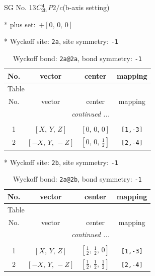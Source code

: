 \documentclass[fleqn,8pt]{jsarticle}
\begin{document}
\setcounter{MaxMatrixCols}{32}

\renewcommand{\tablename}{Table~}
\renewcommand{\figurename}{Figure~}
\begin{center}
\LARGE
SG No. 13\quad$C_{\rm 2h}^{4}$\quad$P2/c$\quad(b-axis setting)\quad[ monoclinic ]
\end{center}

* plus set:\,\,\,$+\left[ 0,\, 0,\, 0 \right]$


* Wyckoff site: {\tt 2a}, site symmetry: {\tt -1}
\renewcommand{\arraystretch}{1.2}
\begin{longtable}{cccc}
\caption{Wyckoff bond: {\tt 2a@2a}, bond symmetry: {\tt -1}}
 \\
 \hline \hline
No. & vector & center & mapping \\ \hline \endfirsthead

\multicolumn{3}{l}{\tablename\ \thetable{}} \\
 \hline \hline
No. & vector & center & mapping \\ \hline \endhead

 \hline \hline
\multicolumn{3}{r}{\footnotesize\it continued ...} \\ \endfoot

 \hline \hline
\multicolumn{3}{r}{} \\ \endlastfoot

1 & $\left[ X,\, Y,\, Z \right]$ & $\left[ 0,\, 0,\, 0 \right]$ & {\tt [1,-3]} \\ \hline
2 & $\left[ - X,\, Y,\, - Z \right]$ & $\left[ 0,\, 0,\, \frac{1}{2} \right]$ & {\tt [2,-4]} \\
\end{longtable}
* Wyckoff site: {\tt 2b}, site symmetry: {\tt -1}
\renewcommand{\arraystretch}{1.2}
\begin{longtable}{cccc}
\caption{Wyckoff bond: {\tt 2a@2b}, bond symmetry: {\tt -1}}
 \\
 \hline \hline
No. & vector & center & mapping \\ \hline \endfirsthead

\multicolumn{3}{l}{\tablename\ \thetable{}} \\
 \hline \hline
No. & vector & center & mapping \\ \hline \endhead

 \hline \hline
\multicolumn{3}{r}{\footnotesize\it continued ...} \\ \endfoot

 \hline \hline
\multicolumn{3}{r}{} \\ \endlastfoot

1 & $\left[ X,\, Y,\, Z \right]$ & $\left[ \frac{1}{2},\, \frac{1}{2},\, 0 \right]$ & {\tt [1,-3]} \\ \hline
2 & $\left[ - X,\, Y,\, - Z \right]$ & $\left[ \frac{1}{2},\, \frac{1}{2},\, \frac{1}{2} \right]$ & {\tt [2,-4]} \\
\end{longtable}
\end{document}
